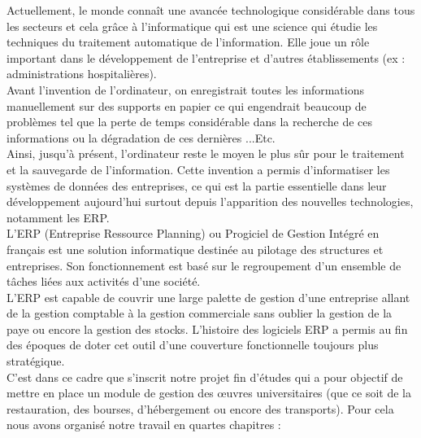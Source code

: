 Actuellement, le monde connaît une avancée technologique considérable dans tous les secteurs et cela grâce à l'informatique qui est une science qui étudie les techniques du traitement automatique de l'information. Elle joue un rôle important dans le développement de l'entreprise et d'autres établissements (ex : administrations hospitalières).\\

Avant l'invention de l'ordinateur, on enregistrait toutes les informations manuellement sur des supports en papier ce qui engendrait beaucoup de problèmes tel que la perte de temps considérable dans la recherche de ces informations ou la dégradation de ces dernières ...Etc.\\

Ainsi, jusqu'à présent, l'ordinateur reste le moyen le plus sûr pour le traitement et la sauvegarde de l'information. Cette invention a permis d'informatiser les systèmes de données des entreprises, ce qui est la partie essentielle dans leur développement aujourd'hui surtout depuis l'apparition des nouvelles technologies, notamment les \acs{ERP}.\\

L'\acs{ERP} (Entreprise Ressource Planning) ou Progiciel de Gestion Intégré en français est une solution informatique destinée au pilotage des structures et entreprises. Son fonctionnement est basé sur le regroupement d'un ensemble de tâches liées aux activités d'une société.\\

L'\acs{ERP} est capable de couvrir une large palette de gestion d'une entreprise allant de la gestion comptable à la gestion commerciale sans oublier la gestion de la paye ou encore la gestion des stocks. L'histoire des logiciels \acs{ERP} a permis au fin des époques de doter cet outil d'une couverture fonctionnelle toujours plus stratégique.\\

C'est dans ce cadre que s'inscrit notre projet fin d'études qui a pour objectif de mettre en place un module de gestion des œuvres universitaires (que ce soit de la restauration, des bourses, d'hébergement ou encore des transports). Pour cela nous avons organisé notre travail en quartes chapitres :\\

